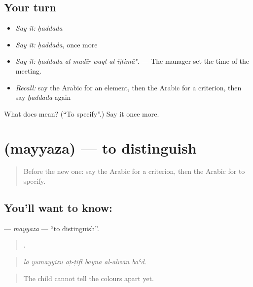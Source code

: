 \subsection*{Your turn}
\begin{itemize}
\raggedright
  \item \emph{Say it:} \emph{ḥaddada}
  \item \emph{Say it:} \emph{ḥaddada}, once more
  \item \emph{Say it:} \emph{ḥaddada al-mudīr waqt al-ijtimāʿ.} — The manager set the time of the meeting.
  \item \emph{Recall:} say the Arabic for an element, then the Arabic for a criterion, then say \emph{ḥaddada} again
\end{itemize}

\begin{tcolorbox}[breakable,colback=teal!4,colframe=teal!35!black,title={Before you move on}]
What does  mean? (\textquotedblleft{}To specify\textquotedblright{}.) Say it once more.
\end{tcolorbox}
\section[\texorpdfstring{\ar{ميز} (mayyaza)}{ميز (mayyaza)}]{ (mayyaza) — to distinguish}

\label{lesson:AR-C364-mayyaza}



\begin{quote}
Before the new one: say the Arabic for a criterion, then the Arabic for to specify.
\end{quote}

\subsection*{You'll want to know: }
\textbf{} — \emph{mayyaza} — \textquotedblleft{}to distinguish\textquotedblright{}.

\begin{quote}
     .
\end{quote}

\begin{quote}
\emph{lā yumayyizu aṭ-ṭifl bayna al-alwān baʿd.}
\end{quote}

\begin{quote}
The child cannot tell the colours apart yet.
\end{quote}

